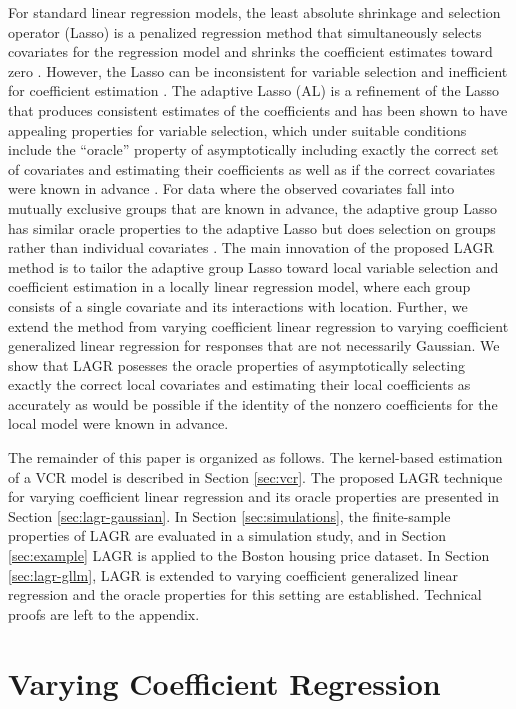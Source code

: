 \documentclass[authoryear,review, 12pt]{elsarticle}
\begin{document}
For standard linear regression models, the least absolute shrinkage
and selection operator (Lasso) is a penalized regression method that
simultaneously selects covariates for the regression model and shrinks
the coefficient estimates toward zero \citep{Tibshirani-1996}. However,
the Lasso can be inconsistent for variable selection and inefficient
for coefficient estimation \citep{Zou-2006}. The adaptive Lasso (AL)
is a refinement of the Lasso that produces consistent estimates of
the coefficients and has been shown to have appealing properties for
variable selection, which under suitable conditions include the ``oracle''
property of asymptotically including exactly the correct set of covariates
and estimating their coefficients as well as if the correct covariates
were known in advance \citep{Zou-2006}. For data where the observed
covariates fall into mutually exclusive groups that are known in advance,
the adaptive group Lasso has similar oracle properties to the adaptive
Lasso but does selection on groups rather than individual covariates
\citep{Yuan-Lin-2006,Wang-Leng-2008}. The main innovation of the
proposed LAGR method is to tailor the adaptive group Lasso toward
local variable selection and coefficient estimation in a locally linear
regression model, where each group consists of a single covariate
and its interactions with location. Further, we extend the method
from varying coefficient linear regression to varying coefficient
generalized linear regression for responses that are not necessarily
Gaussian. We show that LAGR posesses the oracle properties of asymptotically
selecting exactly the correct local covariates and estimating their
local coefficients as accurately as would be possible if the identity
of the nonzero coefficients for the local model were known in advance.

The remainder of this paper is organized as follows. The kernel-based
estimation of a VCR model is described in Section \ref{sec:vcr}.
The proposed LAGR technique for varying coefficient linear regression
and its oracle properties are presented in Section \ref{sec:lagr-gaussian}.
In Section \ref{sec:simulations}, the finite-sample properties of
LAGR are evaluated in a simulation study, and in Section \ref{sec:example}
LAGR is applied to the Boston housing price dataset. In Section \ref{sec:lagr-gllm},
LAGR is extended to varying coefficient generalized linear regression
and the oracle properties for this setting are established. Technical
proofs are left to the appendix.


\section{Varying Coefficient Regression\label{sec:vcr}}
\end{document}
